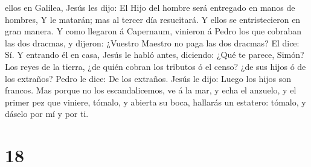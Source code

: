 ellos en Galilea, Jesús les dijo: El Hijo del hombre será entregado en
manos de hombres,  Y le matarán; mas al tercer día
resucitará. Y ellos se entristecieron en gran manera.  Y
como llegaron á Capernaum, vinieron á Pedro los que cobraban las dos
dracmas, y dijeron: ¿Vuestro Maestro no paga las dos dracmas?
 El dice: Sí. Y entrando él en casa, Jesús le habló
antes, diciendo: ¿Qué te parece, Simón? Los reyes de la tierra, ¿de
quién cobran los tributos ó el censo? ¿de sus hijos ó de los extraños?
 Pedro le dice: De los extraños. Jesús le dijo: Luego los
hijos son francos.  Mas porque no los escandalicemos, ve
á la mar, y echa el anzuelo, y el primer pez que viniere, tómalo, y
abierta su boca, hallarás un estatero: tómalo, y dáselo por mí y por ti.

\hypertarget{section-17}{%
\section{18}\label{section-17}}

